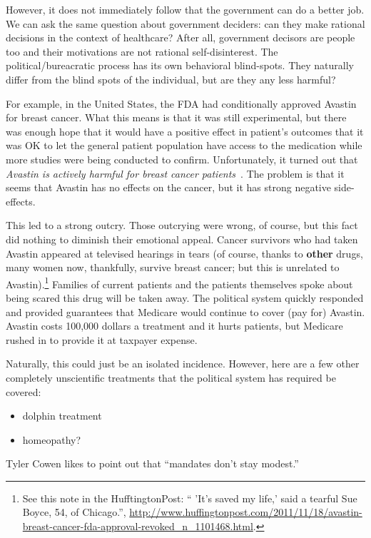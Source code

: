 However, it does not immediately follow that the government can do a better
job. We can ask the same question about government deciders: can they make
rational decisions in the context of healthcare? After all, government decisors
are people too and their motivations are not rational self-disinterest. The
political/bureacratic process has its own behavioral blind-spots. They
naturally differ from the blind spots of the individual, but are they any less
harmful?

For example, in the United States, the FDA had conditionally approved Avastin
for breast cancer. What this means is that it was still experimental, but there
was enough hope that it would have a positive effect in patient's outcomes that
it was OK to let the general patient population have access to the medication
while more studies were being conducted to confirm. Unfortunately, it turned
out that \emph{Avastin is actively harmful for breast cancer
patients}~\cite{avastin-harfmul}. The problem is that it seems that Avastin has
no effects on the cancer, but it has strong negative side-effects.

This led to a strong outcry. Those outcrying were wrong, of course, but this
fact did nothing to diminish their emotional appeal. Cancer survivors who had
taken Avastin appeared at televised hearings in tears (of course, thanks to
\textbf{other} drugs, many women now, thankfully, survive breast cancer; but
this is unrelated to Avastin).\footnote{See this note in the HufftingtonPost:
`` 'It's saved my life,' said a tearful Sue Boyce, 54, of Chicago.'',
\url{http://www.huffingtonpost.com/2011/11/18/avastin-breast-cancer-fda-approval-revoked_n_1101468.html}.}
Families of current patients and the patients themselves spoke about being
scared this drug will be taken away. The political system quickly responded and
provided guarantees that Medicare would continue to cover (pay for) Avastin.
Avastin costs 100,000 dollars a treatment and it hurts patients, but Medicare
rushed in to provide it at taxpayer expense.

Naturally, this could just be an isolated incidence. However, here are a few
other completely unscientific treatments that the political system has required
be covered:

\begin{itemize}
\item dolphin treatment
\item homeopathy?
\end{itemize}

Tyler Cowen likes to point out that ``mandates don't stay modest.''

